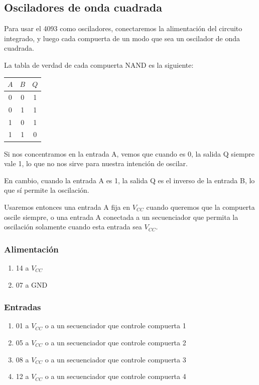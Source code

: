 \documentclass[../principal.tex]{subfiles}
\begin{document}
\subsection{Osciladores de onda cuadrada}

Para usar el 4093 como osciladores, conectaremos la alimentación del circuito integrado, y luego cada compuerta de un modo que sea un oscilador de onda cuadrada.

La tabla de verdad de cada compuerta NAND es la siguiente:

\begin{center}
\begin{tabular}{cc|c}
$A$ & $B$ & $Q$ \\
\hline
0 & 0 & 1 \\
0 & 1 & 1 \\
1 & 0 & 1 \\
1 & 1 & 0 \\
\end{tabular}
\end{center}

Si nos concentramos en la entrada A, vemos que cuando es 0, la salida Q siempre vale 1, lo que no nos sirve para nuestra intención de oscilar.

En cambio, cuando la entrada A es 1, la salida Q es el inverso de la entrada B, lo que sí permite la oscilación. 

Usaremos entonces una entrada A fija en $V_{CC}$ cuando queremos que la compuerta oscile siempre, o una entrada A conectada a un secuenciador que permita la oscilación solamente cuando esta entrada sea $V_{CC}$.


\subsubsection{Alimentación}

\begin{enumerate}
    \item 14 a $V_{CC}$
    \item 07 a GND
\end{enumerate}

\subsubsection{Entradas}

\begin{enumerate}
    \item 01 a $V_{CC}$ o a un secuenciador que controle compuerta 1
    \item 05 a $V_{CC}$ o a un secuenciador que controle compuerta 2
    \item 08 a $V_{CC}$ o a un secuenciador que controle compuerta 3
    \item 12 a $V_{CC}$ o a un secuenciador que controle compuerta 4
\end{enumerate}
\end{document}
